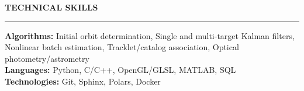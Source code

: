 \documentclass[11pt, a4paper]{article}
\newcommand{\sectiontitle}[1]{{\Large \textbf{#1}}\vspace{0.5em}\hrule\vspace{0.5em}}
\begin{document}
\sectiontitle{TECHNICAL SKILLS}
\textbf{Algorithms:} Initial orbit determination, Single and multi-target Kalman filters, Nonlinear batch estimation, Tracklet/catalog association, Optical photometry/astrometry \\
\textbf{Languages:} Python, C/C++, OpenGL/GLSL, MATLAB, SQL \\
\textbf{Technologies:} Git, Sphinx, Polars, Docker \\
\end{document}
